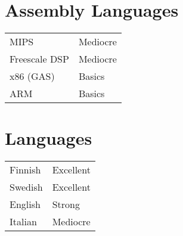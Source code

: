 \documentclass[12pt]{article}
\begin{document}

\section*{Assembly Languages}

\begin{tabular}{ll}
MIPS & Mediocre\\
Freescale DSP & Mediocre\\
x86 (GAS) & Basics\\
ARM & Basics\\
\end{tabular}


\section*{Languages}
\begin{tabular}{ll}
Finnish & Excellent\\
Swedish & Excellent\\
English & Strong\\
Italian & Mediocre\\
\end{tabular}
\end{document}
